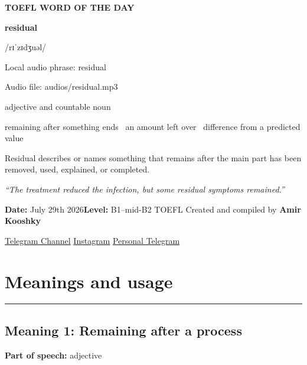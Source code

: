 \documentclass[11pt]{article}
\newcommand{\sectionrule}{\par\vspace{-0.5em}\noindent\textcolor{Accent}{\rule{\linewidth}{0.6pt}}\par}
\begin{document}
\begin{center}
{\sffamily\bfseries\color{Accent} TOEFL WORD OF THE DAY\par}
\vspace{8mm}
{\fontsize{42}{48}\selectfont\bfseries residual\par}
\vspace{2mm}
{\Large\sffamily\color{Accent} /rɪˈzɪdʒuəl/\par}
\vspace{2mm}
{\small\sffamily Local audio phrase: residual\par}
{\small\sffamily Audio file: audios/residual.mp3\par}
\vspace{2mm}
{\large\sffamily\color{Muted} adjective and countable noun\par}
\vspace{5mm}
{\sffamily remaining after something ends \textbullet\ an amount left over \textbullet\ difference from a predicted value\par}
\vspace{6mm}
{\large Residual describes or names something that remains after the main part has been removed, used, explained, or completed.\par}
\vspace{6mm}
\begin{minipage}{0.84\textwidth}
\itshape “The treatment reduced the infection, but some residual symptoms remained.”
\end{minipage}\par
\vspace{10mm}
\textbf{Date:} July 29th 2026\quad\textbullet\quad \textbf{Level:} B1--mid-B2 TOEFL
\vfill
Created and compiled by \textbf{Amir Kooshky}\par
\vspace{2mm}
\href{https://t.me/KooshkyTOEFL}{Telegram Channel}\quad\textbullet\quad
\href{https://www.instagram.com/kooshkytoefl}{Instagram}\quad\textbullet\quad
\href{https://t.me/KooshkyTOEFL\_pv}{Personal Telegram}
\end{center}
\newpage
\tableofcontents
\newpage

\section{Meanings and usage}
\sectionrule
\subsection{Meaning 1: Remaining after a process}
\textbf{Part of speech:} adjective
\end{document}
